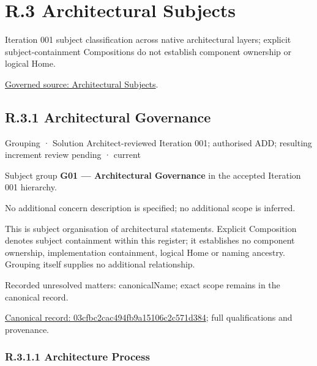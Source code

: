 \chapter*{R.3 Architectural Subjects}
\label{navigation:R.3}

Iteration 001 subject classification across native architectural layers; explicit subject-containment Compositions do not establish component ownership or logical Home.\par
\href{../../../../design/offline-design/Harmoni-NFR-Derived Architetural Elements - Iteration 001.md}{Governed source: Architectural Subjects}.\par
\section*{R.3.1 Architectural Governance}
\label{navigation:R.3.1}

\label{element:03cfbc2cac494fb9a15106c2c571d384}
{\small Grouping · Solution Architect-reviewed Iteration 001; authorised ADD; resulting increment review pending · current}\par

Subject group \textbf{G01 — Architectural Governance} in the accepted Iteration 001 hierarchy.



No additional concern description is specified; no additional scope is inferred.



This is subject organisation of architectural statements. Explicit Composition denotes subject containment within this register; it establishes no component ownership, implementation containment, logical Home or naming ancestry. Grouping itself supplies no additional relationship.


{\small Recorded unresolved matters: canonicalName; exact scope remains in the canonical record.}\par
{\footnotesize \href{../../../../continuum/grouping/03cfbc2cac494fb9a15106c2c571d384.md}{Canonical record: 03cfbc2cac494fb9a15106c2c571d384}; full qualifications and provenance.}\par
\subsection*{R.3.1.1 Architecture Process}
\label{navigation:R.3.1.1}

